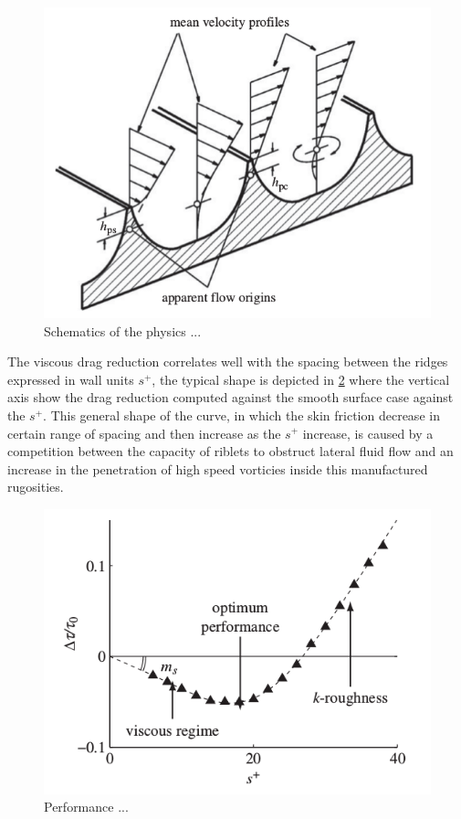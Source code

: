 \begin{figure}[h]
	\centering
	\includegraphics[width=0.7\linewidth]{chapter_1/riblets3}
	\caption{Schematics of the physics ... \citet{bechert1997experiments}}
	\label{fig:riblets1}
\end{figure}


The viscous drag reduction correlates well with the spacing between the ridges expressed in wall units $ s^+ $, the typical shape is depicted in \ref{fig:riblets_perf} where the vertical axis show the drag reduction computed against the smooth surface case against the $ s^+ $.
This general shape of the curve, in which the skin friction decrease in certain range of spacing and then increase as the $ s^+ $ increase, is caused by a competition between the capacity of riblets to obstruct lateral fluid flow and an increase in the penetration of high speed vorticies inside this manufactured rugosities.

\begin{figure}[h]
	\centering
	\includegraphics[width=0.7\linewidth]{chapter_1/riblets_performance}
	\caption{Performance ... \citet{jimenez2001turbulent} }
	\label{fig:riblets_perf}
\end{figure}

